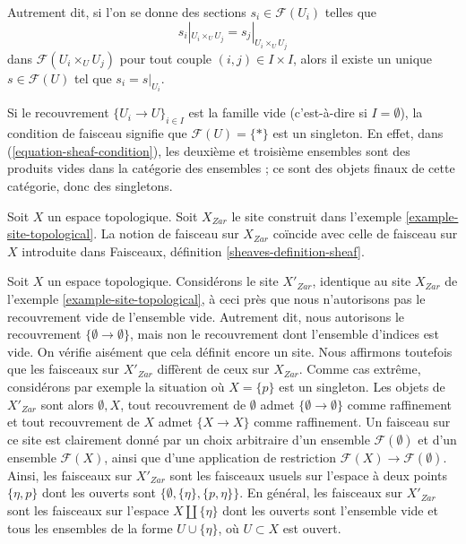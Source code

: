 \noindent
Autrement dit, si l’on se donne des sections
$s_i \in \mathcal{F}(U_i)$ telles que
$$
s_i|_{U_i \times_U U_j} = s_j|_{U_i \times_U U_j}
$$
dans $\mathcal{F}(U_i \times_U U_j)$ pour tout couple
$(i, j) \in I \times I$, alors il existe un unique
$s \in \mathcal{F}(U)$ tel que $s_i = s|_{U_i}$.

\begin{remark}
\label{remark-sheaf-condition-empty-covering}
Si le recouvrement $\{U_i \to U\}_{i \in I}$ est la famille vide
(c’est-à-dire si $I = \emptyset$), la condition de faisceau signifie que
$\mathcal{F}(U) = \{*\}$ est un singleton. En effet, dans
(\ref{equation-sheaf-condition}), les deuxième et troisième ensembles sont
des produits vides dans la catégorie des ensembles ; ce sont des objets
finaux de cette catégorie, donc des singletons.
\end{remark}

\begin{example}
\label{example-sheaves-topological}
Soit $X$ un espace topologique. Soit $X_{Zar}$ le site construit dans
l’exemple \ref{example-site-topological}. La notion de faisceau sur $X_{Zar}$
coïncide avec celle de faisceau sur $X$ introduite dans Faisceaux,
définition \ref{sheaves-definition-sheaf}.
\end{example}

\begin{example}
\label{example-topological-wrong}
Soit $X$ un espace topologique. Considérons le site $X'_{Zar}$, identique au
site $X_{Zar}$ de l’exemple \ref{example-site-topological}, à ceci près que
nous n’autorisons pas le recouvrement vide de l’ensemble vide. Autrement dit,
nous autorisons le recouvrement $\{\emptyset \to \emptyset\}$, mais non le
recouvrement dont l’ensemble d’indices est vide. On vérifie aisément que cela
définit encore un site. Nous affirmons toutefois que les faisceaux sur
$X'_{Zar}$ diffèrent de ceux sur $X_{Zar}$. Comme cas extrême, considérons par
exemple la situation où $X = \{p\}$ est un singleton. Les objets de
$X'_{Zar}$ sont alors $\emptyset, X$, tout recouvrement de $\emptyset$ admet
$\{\emptyset \to \emptyset\}$ comme raffinement et tout recouvrement de $X$
admet $\{X \to X\}$ comme raffinement. Un faisceau sur ce site est clairement
donné par un choix arbitraire d’un ensemble $\mathcal{F}(\emptyset)$ et d’un
ensemble $\mathcal{F}(X)$, ainsi que d’une application de restriction
$\mathcal{F}(X) \to \mathcal{F}(\emptyset)$. Ainsi, les faisceaux sur
$X'_{Zar}$ sont les faisceaux usuels sur l’espace à deux points
$\{\eta, p\}$ dont les ouverts sont
$\{\emptyset, \{\eta\}, \{p, \eta\}\}$. En général, les faisceaux sur
$X'_{Zar}$ sont les faisceaux sur l’espace $X \amalg \{\eta\}$ dont les
ouverts sont l’ensemble vide et tous les ensembles de la forme
$U \cup \{\eta\}$, où $U \subset X$ est ouvert.
\end{example}


